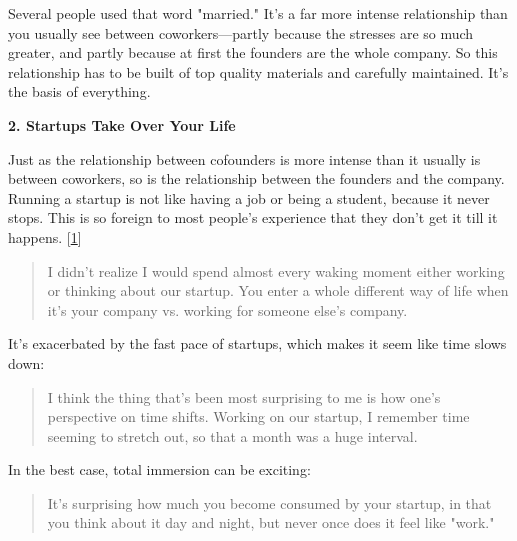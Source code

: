                   Several people used that word "married." It's a far more
                  intense relationship than you usually see between
                  coworkers---partly because the stresses are so much
                  greater, and partly because at first the founders are the
                  whole company. So this relationship has to be built of top
                  quality materials and carefully maintained. It's the basis of
                  everything.


                  \textbf{2. Startups Take Over Your Life}

Just as the
                  relationship between cofounders is more intense than it
                  usually is between coworkers, so is the relationship between
                  the founders and the company. Running a startup is not like
                  having a job or being a student, because it never stops. This
                  is so foreign to most people's experience that they don't get
                  it till it happens.
                  [\href{\#f1n}{1}]
                  \begin{quote}

                    I didn't realize I would spend almost every waking moment
                    either working or thinking about our startup. You enter a
                    whole different way of life when it's your company vs.
                    working for someone else's company.
                  
\end{quote}

                  It's exacerbated by the fast pace of startups, which makes it
                  seem like time slows down:
                  \begin{quote}

                    I think the thing that's been most surprising to me is how
                    one's perspective on time shifts. Working on our startup, I
                    remember time seeming to stretch out, so that a month was a
                    huge interval.
                  
\end{quote}

                  In the best case, total immersion can be exciting:
                  \begin{quote}

                    It's surprising how much you become consumed by your
                    startup, in that you think about it day and night, but never
                    once does it feel like "work."
                  
\end{quote}

